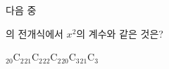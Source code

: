 다음 중 \par\smallskip{}\par\smallskip\noindent 의 전개식에서 $x^2$의 계수와 같은 것은?
\begin{choices32}{${}_{20}\mathrm{C}_2$}{${}_{21}\mathrm{C}_2$}{${}_{22}\mathrm{C}_2$}{${}_{20}\mathrm{C}_3$}{${}_{21}\mathrm{C}_3$}\end{choices32}
